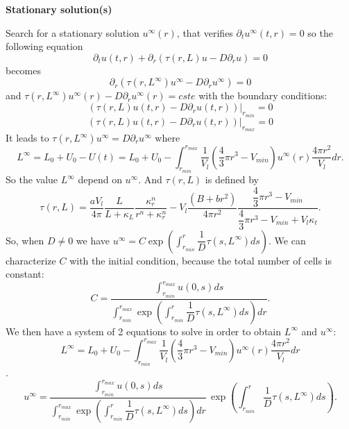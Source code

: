 \documentclass[11pt,a4paper]{article}
\begin{document}
\begin{center}
\large \textbf{Stationary solution(s)}
\end{center}
Search for a stationary solution $u^{\infty}(r)$, that verifies $\partial_t u^{\infty}(t, r) = 0$ so the following equation
$$\partial_t u(t, r) + \partial_r( \tau(r, L) u - D \partial_r u) = 0$$
becomes 
$$\partial_r( \tau(r, L^{\infty}) u^{\infty} - D \partial_r u^{\infty}) = 0$$
and $\tau(r, L^{\infty}) u^{\infty}(r) - D \partial_r u^{\infty}(r) = cste$
with the boundary conditions:
$$(\tau(r, L) u(t,r) - D \partial_r u(t,r)) |_{r_{min}} = 0$$
$$(\tau(r, L) u(t,r) - D \partial_r u(t,r)) |_{r_{max}} = 0$$
It leads to $\tau(r, L^{\infty}) u^{\infty} = D \partial_r u^{\infty}$ where 
$$L^{\infty} = L_0 + U_0 - U(t) = L_0 + U_0 - \displaystyle \int_{r_{min}}^{r_{max}} \dfrac{1}{V_l}(\dfrac{4}{3} \pi r^3 - V_{min})u^{\infty}(r) \dfrac{4\pi r^ 2}{V_l} dr.$$
So the value $L^{\infty}$ depend on $u^{\infty}$.
And $\tau(r, L)$ is defined by 
$$ \tau(r, L) = \dfrac{aV_l}{4\pi}  \dfrac{L}{L + \kappa_L} \dfrac{\kappa_r^n}{r^n+\kappa_r^n} - V_l \dfrac{(B + br^2)}{4\pi r^2} \dfrac{\dfrac{4}{3} \pi r^3 - V_{min}}{\dfrac{4}{3} \pi r^3 - V_{min} + V_l\kappa_t}.$$
So, when $D \neq 0$ we have $u^{\infty} = \displaystyle C \exp \left(\displaystyle  \int_{r_{min}}^{r} \dfrac{1}{D} \tau(s, L^{\infty}) ds \right)$.
We can characterize $C$ with the initial condition, because the total number of cells is constant: 
$$ C = \displaystyle \dfrac{ \displaystyle \int_{r_{min}}^{r_{max}} u(0,s) ds}{\displaystyle \int_{r_{min}}^{r_{max}} \exp  \left( \int_{r_{min}}^{r} \dfrac{1}{D} \tau(s, L^{\infty}) ds \right) dr}.$$
We then have a system of 2 equations to solve in order to obtain $L^{\infty}$ and $u^{\infty}$: 
$$L^{\infty} = L_0 + U_0 - \displaystyle \int_{r_{min}}^{r_{max}} \dfrac{1}{V_l}(\dfrac{4}{3} \pi r^3 - V_{min})u^{\infty}(r) \dfrac{4\pi r^ 2}{V_l} dr$$.
$$u^{\infty} = \displaystyle \dfrac{ \displaystyle \int_{r_{min}}^{r_{max}} u(0,s) ds}{\displaystyle \int_{r_{min}}^{r_{max}} \exp  \left(\displaystyle  \int_{r_{min}}^{r} \dfrac{1}{D} \tau(s, L^{\infty}) ds \right) dr}  \, \exp \left(\displaystyle  \int_{r_{min}}^{r} \dfrac{1}{D} \tau(s, L^{\infty}) ds \right).$$
\end{document}
